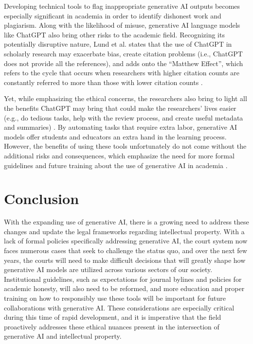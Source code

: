 \documentclass[manuscript,screen]{acmart}
\begin{document}
Developing technical tools to flag inappropriate generative AI outputs becomes especially significant in academia in order to identify dishonest work and plagiarism. Along with the likelihood of misuse, generative AI language models like ChatGPT also bring other risks to the academic field. Recognizing its potentially disruptive nature, Lund et al. states that the use of ChatGPT in scholarly research may exacerbate bias, create citation problems (i.e., ChatGPT does not provide all the references), and adds onto the “Matthew Effect”, which refers to the cycle that occurs when researchers with higher citation counts are constantly referred to more than those with lower citation counts \cite{PAPER:6}.

Yet, while emphasizing the ethical concerns, the researchers also bring to light all the benefits ChatGPT may bring that could make the researchers’ lives easier (e.g., do tedious tasks, help with the review process, and create useful metadata and summaries) \cite{PAPER:6}. By automating tasks that require extra labor, generative AI models offer students and educators an extra hand in the learning process. However, the benefits of using these tools unfortunately do not come without the additional risks and consequences, which emphasize the need for more formal guidelines and future training about the use of generative AI in academia \cite{PAPER:6}.

\section{Conclusion}
With the expanding use of generative AI, there is a growing need to address these changes and update the legal frameworks regarding intellectual property. With a lack of formal policies specifically addressing generative AI, the court system now faces numerous cases that seek to challenge the status quo, and over the next few years, the courts will need to make difficult decisions that will greatly shape how generative AI models are utilized across various sectors of our society. Institutional guidelines, such as expectations for journal bylines and policies for academic honesty, will also need to be reformed, and more education and proper training on how to responsibly use these tools will be important for future collaborations with generative AI. These considerations are especially critical during this time of rapid development, and it is imperative that the field proactively addresses these ethical nuances present in the intersection of generative AI and intellectual property. 



\end{document}
